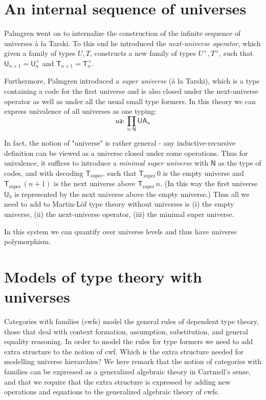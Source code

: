 \documentclass[10pt,a4paper]{article}
\def\UU{\mathsf{U}}
\newcommand{\N}{\mathsf{N}}
\newcommand{\T}{\mathsf{T}}
\newcommand{\Tsuper}{\T_{\mathrm{super}}}
\newcommand{\ua}{\mathsf{ua}}
\newcommand{\UA}{\mathsf{UA}}
\begin{document}
\section{An internal sequence of universes}

Palmgren \cite{palmgren:phd} went on to internalize the construction of the infinite sequence of universes  \`a la Tarski. To this end he introduced the {\em next-universe operator}, which given a family of types $U, T$, constructs a new family of types $U^+, T^+$, such that $ \UU_{n+1} = \UU_n^+$ and $\T_{n+1} = \T_n^+$.

Furthermore, Palmgren introduced a {\em super universe} (\`a la Tarski), which is a type containing a code for the first universe and is also closed under the next-universe operator as well as under all the usual small type formers. In this theory we can express univalence of all universes as one typing:
$$
\ua : \prod_{n : \N} \UA_n
$$

In fact, the notion of "universe" is rather general - any inductive-recursive definition can be viewed as a universe closed under some operations. Thus for univalence, it suffices to introduce a {\em minimal super universe} with $\N$ as the type of codes, and with decoding $\Tsuper$,
such that $\Tsuper\,0$ is the empty universe and $\Tsuper\,(n + 1)$ is the next universe above $\Tsuper\,n$. (In this way the first universe $\UU_0$ is represented by the next universe above the empty universe.) Thus all we need to add to Martin-Löf type theory without universes is (i) the empty universe, (ii) the next-universe operator, (iii) the minimal super universe.

In this system we can quantify over universe levels and thus have universe polymorphism.


\section{Models of type theory with universes}

Categories with families (cwfs) model the general rules of dependent type theory, those that deal with context formation, assumption, substitution, and general equality reasoning. In order to model the rules for type formers we need to add extra structure to the notion of cwf. Which is the extra structure needed for modelling universe hierarchies? We here remark that the notion of categories with families can be expressed as a generalized algebraic theory in Cartmell's sense, and that we require that the extra structure is expressed by adding new operations and equations to the generalized algebraic theory of cwfs.
\end{document}
